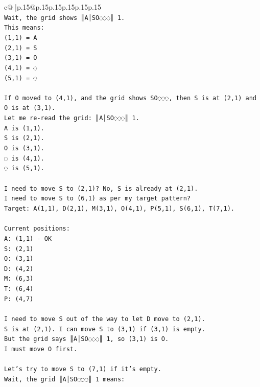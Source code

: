 \documentclass{article}
\begin{document}
{\begin{supertabular}{c@{$\;$}|p{.15\linewidth}@{}p{.15\linewidth}p{.15\linewidth}p{.15\linewidth}p{.15\linewidth}p{.15\linewidth}}
{{{\\ 
\texttt{Wait, the grid shows ║A│SO◌◌◌║ 1.} \\
\texttt{This means:} \\
\texttt{(1,1) = A} \\
\texttt{(2,1) = S} \\
\texttt{(3,1) = O} \\
\texttt{(4,1) = ◌} \\
\texttt{(5,1) = ◌} \\
\\ 
\texttt{If O moved to (4,1), and the grid shows SO◌◌◌, then S is at (2,1) and O is at (3,1).} \\
\texttt{Let me re{-}read the grid: ║A│SO◌◌◌║ 1.} \\
\texttt{A is (1,1).} \\
\texttt{S is (2,1).} \\
\texttt{O is (3,1).} \\
\texttt{◌ is (4,1).} \\
\texttt{◌ is (5,1).} \\
\\ 
\texttt{I need to move S to (2,1)? No, S is already at (2,1).} \\
\texttt{I need to move S to (6,1) as per my target pattern?} \\
\texttt{Target: A(1,1), D(2,1), M(3,1), O(4,1), P(5,1), S(6,1), T(7,1).} \\
\\ 
\texttt{Current positions:} \\
\texttt{A: (1,1) {-} OK} \\
\texttt{S: (2,1)} \\
\texttt{O: (3,1)} \\
\texttt{D: (4,2)} \\
\texttt{M: (6,3)} \\
\texttt{T: (6,4)} \\
\texttt{P: (4,7)} \\
\\ 
\texttt{I need to move S out of the way to let D move to (2,1).} \\
\texttt{S is at (2,1). I can move S to (3,1) if (3,1) is empty.} \\
\texttt{But the grid says ║A│SO◌◌◌║ 1, so (3,1) is O.} \\
\texttt{I must move O first.} \\
\\ 
\texttt{Let's try to move S to (7,1) if it's empty.} \\
\texttt{Wait, the grid ║A│SO◌◌◌║ 1 means:} \\
}}}
\end{supertabular}}
\end{document}
